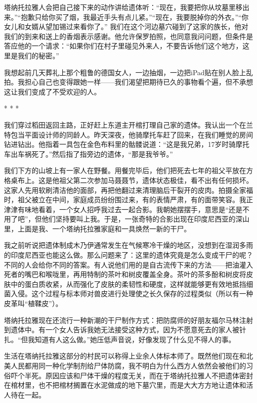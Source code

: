 \documentclass[12pt,oneside]{book}
\begin{document}
\begin{bookref}[frametitle={\cite{好好告别：世界葬礼观察手记}}]
塔纳托拉雅人会把自己接下来的动作讲给遗体听：“现在，我要把你从坟墓里移出来。”“抱歉只给你买了烟，我最近手头有点儿紧。”“现在，我要脱掉你的外衣。”“你女儿和女婿从望加锡过来看你了。”
我们在这个河边墓穴碰到了这家的族长，他对我们的到来和送上的香烟表示感谢。他允许保罗拍照，也同意我问问题，但条件是答应他的一个请求：“如果你们在村子里碰见外来人，不要告诉他们这个地方，这里是我们的秘密。”

我想起前几天葬礼上那个粗鲁的德国女人，一边抽烟，一边把iPad贴在别人脸上乱拍。我担心自己也变得跟她一样——我们渴望把期待已久的事物看个遍，但不承想这让我们变成了不受欢迎的人。

\begin{center}
* * *
\end{center}

我们穿过稻田返回主路，正好赶上东道主开棺打理自己家的遗体。我认出一个在兰特包当平面设计师的同龄人。昨天深夜，他骑摩托车赶了回来，在我们睡觉的房间钻进钻出。他指着一具包在金色布料里的骷髅说道：“这是我兄弟，17岁时骑摩托车出车祸死了。”然后指了指旁边的遗体，“那是我爷爷。”

我们下方的山坡上有一家人在野餐。用餐完毕后，他们把死去七年的祖父平放在方格桌布上。这是他祖父第二次参加马聂聂节，遗体状态极佳，看不出有任何损坏。这家人先用软刷清洁他的面部，再把他翻过来清理脑后干裂开的皮肉。拍摄全家福时，祖父被立在中间，家庭成员纷纷围过来，有的表情严肃，有的面带笑容。我正津津有味地看着，一个女人招呼我过去一起合影。我朝她摆摆手，意思是“还是不用了吧”，但他们坚持要叫上我。于是，一张奇特的合影出现在印度尼西亚的深山里，上面是我、一个塔纳托拉雅家庭和一具焕然一新的干尸。

我之前听说把遗体制成木乃伊通常发生在气候寒冷干燥的地区，没想到在湿润多雨的印度尼西亚也能这么做。那么问题来了：这里的遗体究竟是怎么变成干尸的呢？不同的人会给你不同的答案。有人说他们用的是自古流传下来的方法——把油灌入死者的嘴巴和喉咙里，再用特制的茶叶和树皮覆盖全身。茶叶的茶多酚和树皮将皮肤中的蛋白质收紧，从而强化了皮肤的柔韧性和硬度，这样就能够更有效地抵挡细菌入侵。这个过程与标本师对兽皮进行处理使之长久保存的过程类似（所以有一种皮革叫“植鞣皮”）。

塔纳托拉雅现在还流行一种新潮的干尸制作方式：把防腐师的好朋友福尔马林注射到遗体中。有一个女人告诉我她无法接受这种方式，因为不愿意死去的家人被针扎。“但我知道有人这么做。”她压低声音说，好像发现了什么见不得人的事。

生活在塔纳托拉雅这部分的村民可以称得上业余人体标本师了。既然他们现在和北美人民都用同一种化学制剂给尸体防腐，我不明白为什么西方人依然会被他们的习俗吓个半死。原因应该和尸体干燥的程度无关，而在于塔纳托拉雅人不把遗体密封在棺材里，也不把棺材搁置在水泥做成的地下墓穴里，而是大大方方地让遗体和活人待在一起。


\end{bookref}
\end{document}
